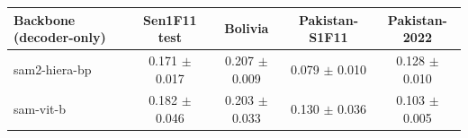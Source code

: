 \begin{tabular}{lcccc}
\toprule
Backbone (decoder-only) & Sen1F11 test & Bolivia & Pakistan-S1F11 & Pakistan-2022 \\
\midrule
sam2-hiera-bp & 0.171 $\pm$ 0.017 & 0.207 $\pm$ 0.009 & 0.079 $\pm$ 0.010 & 0.128 $\pm$ 0.010 \\
sam-vit-b & 0.182 $\pm$ 0.046 & 0.203 $\pm$ 0.033 & 0.130 $\pm$ 0.036 & 0.103 $\pm$ 0.005 \\
\bottomrule
\end{tabular}
